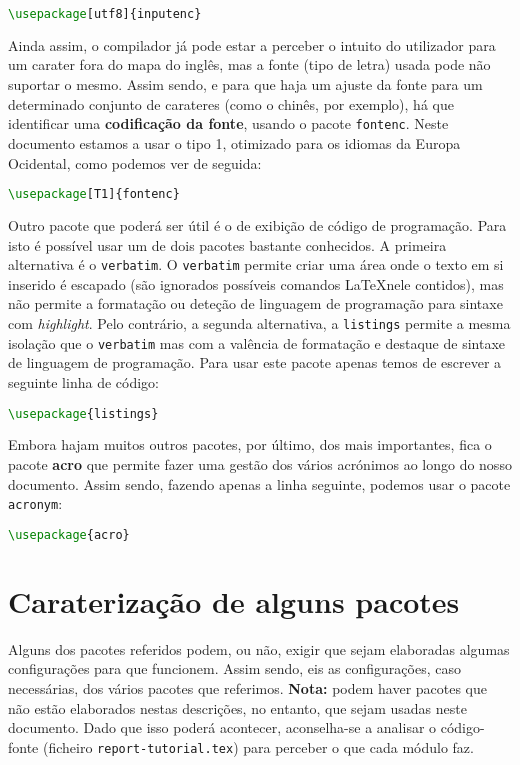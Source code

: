 \documentclass[a4paper, onecolumn, 10pt]{report}
\begin{document}
\begin{lstlisting}[language=TeX]
\usepackage[utf8]{inputenc}
\end{lstlisting}

Ainda assim, o compilador já pode estar a perceber o intuito do utilizador para um carater fora do mapa do inglês, mas a fonte (tipo de letra)
usada pode não suportar o mesmo. Assim sendo, e para que haja um ajuste da fonte para um determinado conjunto de carateres (como o chinês, por
exemplo), há que identificar uma \textbf{codificação da fonte}, usando o pacote \texttt{fontenc}. Neste documento estamos a usar o tipo 1,
otimizado para os idiomas da Europa Ocidental, como podemos ver de seguida:

\begin{lstlisting}[language=TeX]
\usepackage[T1]{fontenc}
\end{lstlisting}

Outro pacote que poderá ser útil é o de exibição de código de programação. Para isto é possível usar um de dois pacotes bastante conhecidos. A
primeira alternativa é o \texttt{verbatim}. O \texttt{verbatim} permite criar uma área onde o texto em si inserido é escapado (são ignorados
possíveis comandos \LaTeX nele contidos), mas não permite a formatação ou deteção de linguagem de programação para sintaxe com \textit{highlight}.
Pelo contrário, a segunda alternativa, a \texttt{listings} permite a mesma isolação que o \texttt{verbatim} mas com a valência de formatação e destaque
de sintaxe de linguagem de programação. Para usar este pacote apenas temos de escrever a seguinte linha de código:

\begin{lstlisting}[language=TeX]
\usepackage{listings}
\end{lstlisting}

Embora hajam muitos outros pacotes, por último, dos mais importantes, fica o pacote \textbf{acro} que permite fazer uma gestão dos vários acrónimos
ao longo do nosso documento. Assim sendo, fazendo apenas a linha seguinte, podemos usar o pacote \texttt{acronym}:

\begin{lstlisting}[language=TeX]
\usepackage{acro}
\end{lstlisting}

\section{Caraterização de alguns pacotes}
Alguns dos pacotes referidos podem, ou não, exigir que sejam elaboradas algumas configurações para que funcionem. Assim sendo, eis as configurações, caso
necessárias, dos vários pacotes que referimos. \textbf{Nota:} podem haver pacotes que não estão elaborados nestas descrições, no entanto, que sejam usadas
neste documento. Dado que isso poderá acontecer, aconselha-se a analisar o código-fonte (ficheiro \texttt{report-tutorial.tex}) para perceber o que cada
módulo faz.
\end{document}
